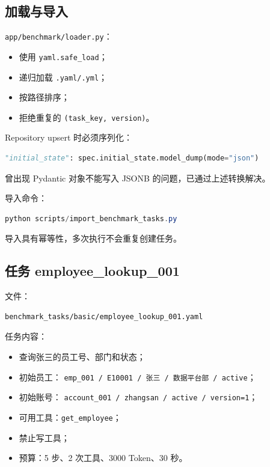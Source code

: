 \documentclass[11pt,a4paper]{ctexart}
\begin{document}
\subsection{加载与导入}

\texttt{app/benchmark/loader.py}：

\begin{itemize}[leftmargin=2em]
  \item 使用 \texttt{yaml.safe\_load}；
  \item 递归加载 \texttt{.yaml/.yml}；
  \item 按路径排序；
  \item 拒绝重复的 \texttt{(task\_key, version)}。
\end{itemize}

Repository upsert 时必须序列化：

\begin{lstlisting}[language=Python]
"initial_state": spec.initial_state.model_dump(mode="json")
\end{lstlisting}

曾出现 Pydantic 对象不能写入 JSONB 的问题，已通过上述转换解决。

导入命令：

\begin{lstlisting}[language=PowerShell]
python scripts/import_benchmark_tasks.py
\end{lstlisting}

导入具有幂等性，多次执行不会重复创建任务。

\subsection{任务 employee\_lookup\_001}

文件：

\begin{lstlisting}
benchmark_tasks/basic/employee_lookup_001.yaml
\end{lstlisting}

任务内容：

\begin{itemize}[leftmargin=2em]
  \item 查询张三的员工号、部门和状态；
  \item 初始员工：
        \texttt{emp\_001 / E10001 / 张三 / 数据平台部 / active}；
  \item 初始账号：
        \texttt{account\_001 / zhangsan / active / version=1}；
  \item 可用工具：\texttt{get\_employee}；
  \item 禁止写工具；
  \item 预算：5 步、2 次工具、3000 Token、30 秒。
\end{itemize}
\end{document}
